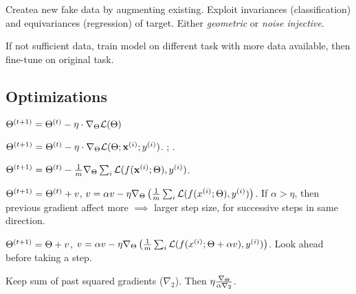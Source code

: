 \begin{definition}
    Createa new fake data by augmenting existing. Exploit invariances (classification) and equivariances (regression) of target. Either \textit{geometric} or \textit{noise injective}.
\end{definition}

\begin{definition}
    If not sufficient data, train model on different task with more data available, then fine-tune on original task.
\end{definition}

\subsection{Optimizations}
\begin{definition}[GD]
    \(\Theta^{(t+1)} = \Theta^{(t)} - \eta \cdot \nabla_\Theta \mathcal{L}(\Theta)\)
\end{definition}

\begin{definition}[SGD]
    \(\Theta^{(t+1)} = \Theta^{(t)} - \eta \cdot \nabla_\Theta \mathcal{L}(\Theta; \vb{x}^{(i)}; y^{(i)})\).
    ;
    .
\end{definition}

\begin{definition}[MB-GD]
    \(\Theta^{(t+1)} = \Theta^{(t)} - \frac 1 m \nabla_\Theta \sum_i \mathcal{L}(f(\vb{x}^{(i)}; \Theta), y^{(i)})\).
\end{definition}

\begin{definition}
    \(\Theta^{(t+1)} = \Theta^{(t)} + v\), \(v = \alpha v - \eta \nabla_\Theta\left(\frac 1 m \sum_i \mathcal{L}(f(x^{(i)}; \Theta), y^{(i)})\right)\). If \(\alpha > \eta\), then previous gradient affect more \(\implies\) larger step size, for successive steps in same direction.
\end{definition}

\begin{definition}
    \(\Theta^{(t+1)} = \Theta + v\), \(v = \alpha v - \eta \nabla_\Theta\left(\frac 1 m \sum_i \mathcal{L}(f(x^{(i)}; \Theta + \alpha v), y^{(i)})\right)\). Look ahead before taking a step.
\end{definition}

\begin{definition}[AdaGrad]
    Keep sum of past squared gradients (\(\nabla_2\)). Then \(\eta \frac{\nabla_\Theta}{\alpha \nabla_2} \).
\end{definition}

